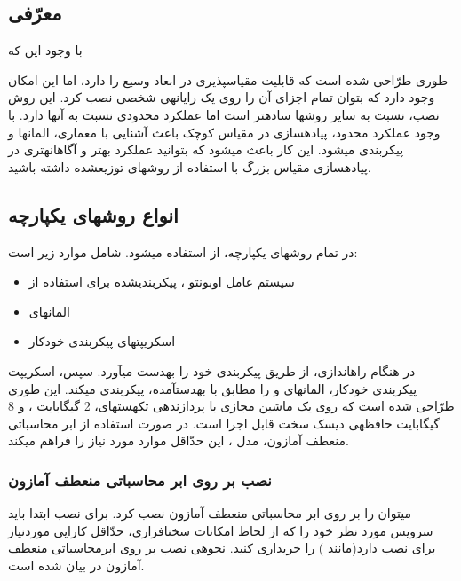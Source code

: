 \subsection{معرّفی}
با وجود این که { طوری طرّاحی شده است که قابلیت مقیاس\nf پذیری در ابعاد وسیع را دارد، اما این امکان وجود دارد که بتوان تمام اجزای آن را روی یک رایانه\nf ی شخصی نصب کرد. این روش نصب، نسبت به سایر روش\nf ها ساده\nf تر است اما عملکرد محدودی نسبت به آن\nf ها دارد. با وجود عملکرد محدود، پیاده\nf سازی  در مقیاس کوچک باعث آشنایی با معماری، المان\nf ها و پیکربندی  می\nf شود. این کار باعث می\nf شود که بتوانید عملکرد بهتر و آگاهانه\nf تری در پیاده\nf سازی مقیاس بزرگ با استفاده از روش\nf های توزیع\nf شده داشته باشید.

\subsection{انواع روش\nf های یکپارچه}
در تمام روش\nf های یکپارچه، از   استفاده می\nf شود.   شامل موارد زیر است:
\begin{itemize}
\item سیستم عامل اوبونتو ، پیکربندی\nf شده برای استفاده از 
\item المان\nf های 
\item اسکریپت\nf های پیکربندی خودکار 
\end{itemize}

\label{yekparchePart}

در هنگام راه\nf اندازی،  از طریق  پیکربندی  خود را به\nf دست می\nf آورد. سپس، اسکریپت پیکربندی خودکار، المان\nf های  و  را مطابق با  به\nf دست\nf آمده، پیکربندی می\nf کند. این  طوری طرّاحی شده است که روی یک ماشین مجازی با پردازنده\nf ی تک\nf هسته\nf ای، 2 گیگابایت ، و 8 گیگابایت حافظه\nf ی دیسک سخت قابل اجرا است. در صورت استفاده از ابر محاسباتی منعطف آمازون، مدل ، این حدّاقل موارد مورد نیاز را فراهم می\nf کند. 

\subsubsection{نصب بر روی ابر محاسباتی منعطف آمازون}

می\nf توان  را بر روی ابر محاسباتی منعطف آمازون نصب کرد. برای نصب ابتدا باید سرویس مورد نظر خود را که از لحاظ امکانات سخت\nf افزاری، حدّاقل کارایی موردنیاز برای نصب  دارد(مانند ) را خریداری کنید. نحوه\nf ی نصب بر روی ابرمحاسباتی منعطف آمازون در \cite{webec2} بیان شده است. 


}

